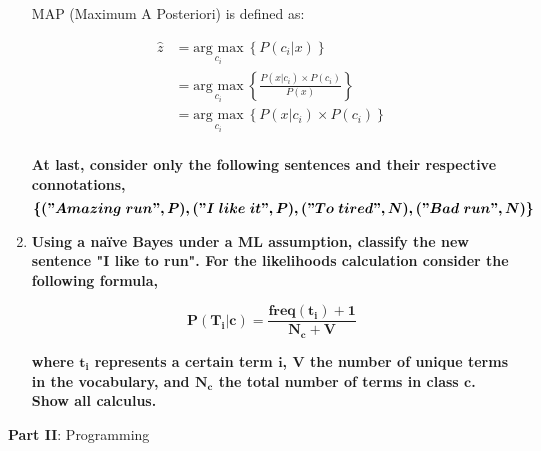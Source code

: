 \documentclass[12pt]{article}
\begin{document}
\begin{enumerate}[leftmargin=\labelsep]
    MAP (Maximum A Posteriori) is defined as:
    
    \begin{equation}\label{map}
        \begin{aligned}
          \hat{z} & = \underset{c_i}{\text{arg max}} \medspace \left\{P(c_i | x)\right\} \\
                  & = \underset{c_i}{\text{arg max}} \medspace \left\{\frac{P(x | c_i)  \times P(c_i)}{P(x)}\right\} \\
                  & = \underset{c_i}{\text{arg max}} \medspace \left\{P(x | c_i)  \times P(c_i)\right\} \\
        \end{aligned}
    \end{equation}
    















    \textbf{At last, consider only the following sentences and their respective connotations,}
    \[
    \boldsymbol{\{("Amazing\; run", P), ("I\; like\; it", P), ("To\; tired", N), ("Bad\; run", N)\}}
    \]

    \item \textbf{Using a naïve Bayes under a ML assumption, classify the new sentence
    "I like to run". For the likelihoods calculation consider the following formula,}

    \begin{equation*}
        \boldsymbol{P(T_i|c) = \frac{freq(t_i) + 1}{N_c + V}}
    \end{equation*}

    \textbf{where $\mathbf{t_i}$ represents a certain term $\mathbf{i}$, $\mathbf{V}$ the number of unique terms in the vocabulary, and
    $\mathbf{N_c}$ the total number of terms in class $\mathbf{c}$. Show all calculus.}

    
\end{enumerate}

\vspace{10pt}

\large{\textbf{Part II}: Programming}\normalsize
\end{document}
